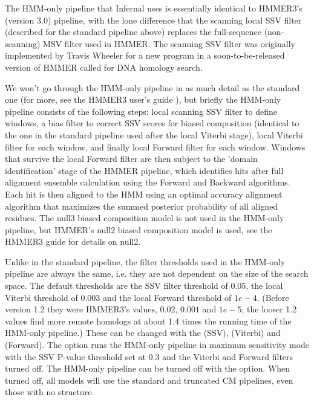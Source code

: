The HMM-only pipeline that Infernal uses is essentially identical to
HMMER3's (version 3.0) pipeline, with the lone
difference that the scanning local SSV filter (described for the
standard pipeline above) replaces the full-sequence (non-scanning) MSV
filter used in HMMER. The scanning SSV filter was originally
implemented by Travis Wheeler for a new program in a
soon-to-be-released version of HMMER called  for DNA
homology search.

We won't go through the HMM-only pipeline in as much detail as the
standard one (for more, see the HMMER3 user's guide
\citep{hmmer3guide}), but briefly the HMM-only pipeline consists of
the following steps: local scanning SSV filter to define windows, a
bias filter to correct SSV scores for biased composition (identical to
the one in the standard pipeline used after the local Viterbi stage),
local Viterbi filter for each window, and finally local Forward filter
for each window. Windows that survive the local Forward filter are
then subject to the 'domain identification' stage of the HMMER
pipeline, which identifies hits after full alignment ensemble
calculation using the Forward and Backward algorithms. Each hit is
then aligned to the HMM using an optimal accuracy alignment algorithm
that maximizes the summed posterior probability of all aligned
residues. The null3 biased composition model is not used in the
HMM-only pipeline, but HMMER's null2 biased composition model is used, 
see the HMMER3 guide for details on null2.

Unlike in the standard pipeline, the filter thresholds used in the
HMM-only pipeline are always the same, i.e. they are not dependent on
the size of the search space. The default thresholds are the SSV
filter threshold of $0.05$, the local Viterbi threshold of $0.003$ and
the local Forward threshold of $1e-4$. (Before version 1.2 they were
HMMER3's values, $0.02$, $0.001$ and $1e-5$; the looser 1.2 values
find more remote homologs at about 1.4 times the running time of the
HMM-only pipeline.) These can be changed with the 
(SSV),  (Viterbi) and  (Forward). The
 option runs the HMM-only pipeline in maximum
sensitivity mode with the SSV P-value threshold set at 0.3 and the
Viterbi and Forward filters turned off. The HMM-only pipeline can be
turned off with the  option. When turned off, all
models will use the standard and truncated CM pipelines, even those
with no structure.

